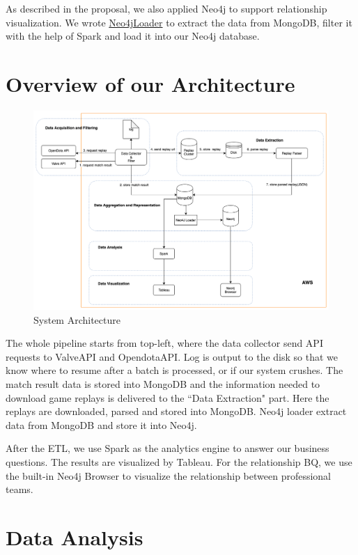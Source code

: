 \documentclass{article}
\begin{document}
As described in the proposal, we also applied Neo4j to support relationship visualization. We wrote \href{https://github.com/Vopaaz/big-data-psg-lgd/blob/9916e0a5a95245062d110446eb4014312087ef9e/src/main/scala/Neo4j/LoadNeo4j.scala#L16}{Neo4jLoader} to extract the data from MongoDB, filter it with the help of Spark and load it into our Neo4j database.

\section{Overview of our Architecture}

\begin{figure}[H]
\centering
\includegraphics[width=\textwidth]{pic/arc-new.png}
\caption{System Architecture}
\label{system-architecture}
\end{figure}

The whole pipeline starts from top-left, where the data collector send API requests to ValveAPI and OpendotaAPI.
Log is output to the disk so that we know where to resume after a batch is processed, or if our system crushes.
The match result data is stored into MongoDB and the information needed to download game replays is delivered to the ``Data Extraction" part. Here the replays are downloaded, parsed and stored into MongoDB.
Neo4j loader extract data from MongoDB and store it into Neo4j.

After the ETL, we use Spark as the analytics engine to answer our business questions.
The results are visualized by Tableau. For the relationship BQ, we use the built-in Neo4j Browser to visualize the relationship between professional teams.

\section{Data Analysis}
\end{document}
